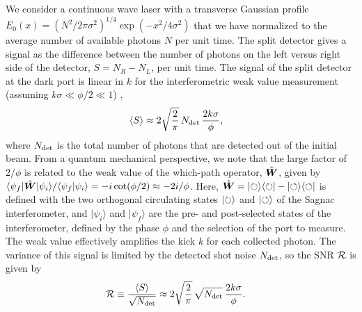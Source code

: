 We consider a continuous wave laser with a transverse Gaussian profile $E_0(x) = (N^2/2\pi\sigma^2)^{1/4}\exp(-x^2/4\sigma^2)$ that we have normalized to the average number of available photons $N$ per unit time.  The split detector gives a signal as the difference between the number of photons on the left versus right side of the detector, $S = N_R - N_L$, per unit time.
The signal of the split detector at the dark port is linear in $k$ for the interferometric weak value measurement (assuming $k\sigma \ll \phi/2 \ll 1$) \cite{Dixon2009,Dressel2013},
\begin{align}\label{eq:signal}
  \left\langle S \right\rangle &\approx 2\sqrt{\frac{2}{\pi}}\,N_{\rm det}\,\frac{2k\sigma}{\phi},
\end{align}
where $N_{\rm det}$ is the total number of photons that are detected out of the initial beam.  From a quantum mechanical perspective, we note that the large factor of $2/\phi$ is related to the weak value of the which-path operator, $\hat{\bm W}$, given by $\langle \psi_f | \hat{\bm W} | \psi_i \rangle /\langle \psi_f | \psi_i \rangle  = -i \cot(\phi/2) \approx -2i/\phi$.  Here, $\hat{\bm W}=\lvert \circlearrowright\rangle\langle \circlearrowright \rvert-\lvert \circlearrowleft\rangle\langle \circlearrowleft \rvert$ is defined with the two orthogonal circulating states $\lvert \circlearrowright\rangle$ and $\lvert \circlearrowleft\rangle$ of the Sagnac interferometer, and $|\psi_i\rangle$ and $| \psi_f \rangle$ are the pre- and post-selected states of the interferometer, defined by the phase $\phi$ and the selection of the port to measure.  The weak value effectively amplifies the kick $k$ for each collected photon.  The variance of this signal is limited by the detected shot noise $N_{\rm det}$, so the SNR ${\cal R}$ is given by
\begin{align}\label{eq:snr}
  {\cal R} &\equiv \frac{\left\langle S \right\rangle}{\sqrt{N_{\rm det}}} \approx 2\sqrt{\frac{2}{\pi}}\,\sqrt{N_{\rm det}}\,\frac{2k\sigma}{\phi}.
\end{align}


